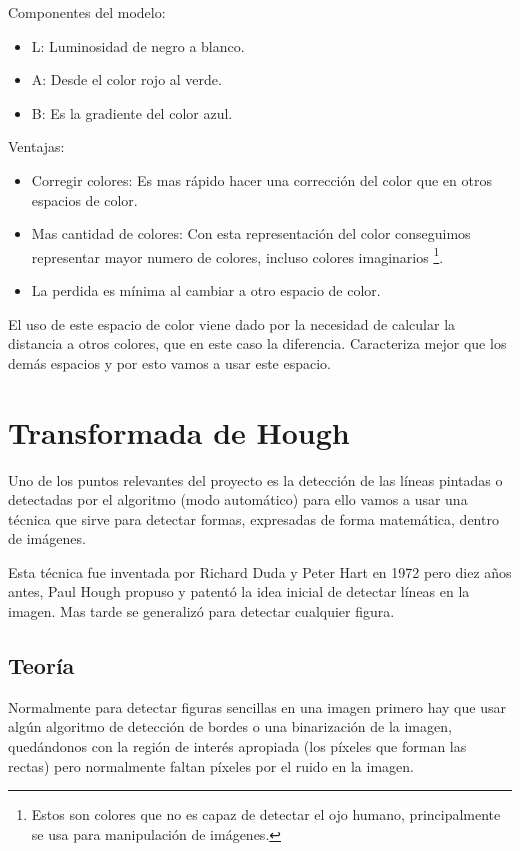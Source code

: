 Componentes del modelo:
\begin{itemize}
	\item L: Luminosidad de negro a blanco.
	\item A: Desde el color rojo al verde.
	\item B: Es la gradiente del color azul.
\end{itemize}

Ventajas:
\begin{itemize}
\item Corregir colores: Es mas rápido hacer una corrección del color que en otros espacios de color.
\item Mas cantidad de colores: Con esta representación del color conseguimos representar mayor numero de colores, incluso colores imaginarios \footnote{Estos son colores que no es capaz de detectar el ojo humano, principalmente se usa para manipulación de imágenes.}.
\item La perdida es mínima al cambiar a otro espacio de color.
\end{itemize}

El uso de este espacio de color viene dado por la necesidad de calcular la distancia a otros colores, que en este caso la diferencia. Caracteriza mejor que los demás espacios y por esto vamos a usar este espacio.
\section{Transformada de Hough }

Uno de los puntos relevantes del proyecto es la detección de las líneas pintadas o detectadas por el algoritmo (modo automático) para ello vamos a usar una técnica que sirve para detectar formas, expresadas de forma matemática, dentro de imágenes.

Esta técnica fue inventada por Richard Duda y Peter Hart en 1972 pero diez años antes, Paul Hough propuso y patentó \cite{pat:patHough} la idea inicial de detectar líneas en la imagen. Mas tarde se generalizó para detectar cualquier figura.

\subsection{Teoría}

Normalmente para detectar figuras sencillas en una imagen primero hay que usar algún algoritmo de detección de bordes o una binarización de la imagen, quedándonos con la región de interés apropiada (los píxeles que forman las rectas) pero normalmente faltan píxeles por el ruido en la imagen.

